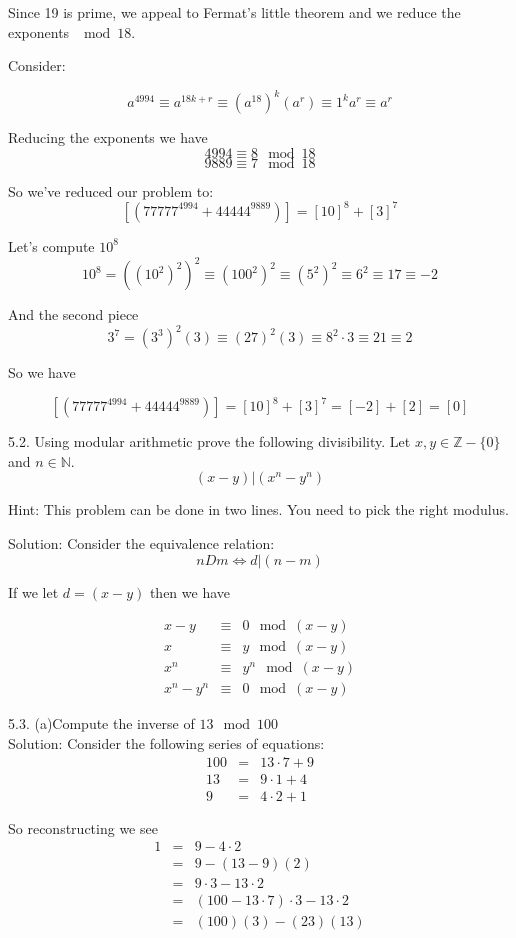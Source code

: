 \documentclass[16 pt]{amsart}
\theoremstyle{definition}
\theoremstyle{remark}
\numberwithin{equation}{subsection}
\newcommand{\Z}{\mathbb{Z}}
\begin{document}
Since 19 is prime, we appeal to Fermat's little theorem and we reduce the exponents $\mod 18$.  

Consider:

\[
a^{4994} \equiv a^{18k + r} \equiv (a^{18})^k(a^r) \equiv 1^k a^r \equiv a^r
\]


Reducing the exponents we have
\[
4994 \equiv 8 \mod 18
\]
\[
9889 \equiv 7 \mod 18
\]


So we've reduced our problem to:
\[
[(77777^{4994}+ 44444^{9889})] = [10]^8 + [3]^7
\]

Let's compute $10^8$
\[
10^8 = ((10^2)^2)^2 \equiv (100^2)^2 \equiv (5^2)^2 \equiv 6^2 \equiv 17 \equiv -2
\]

And the second piece
\[
3^7 = (3^3)^2 (3) \equiv (27)^2(3) \equiv 8^2\cdot 3 \equiv 21 \equiv 2
\]


So we have

\[
[(77777^{4994}+ 44444^{9889})] = [10]^8 + [3]^7 = [-2]+[2] = [0]
\]


5.2.  Using modular arithmetic prove the following divisibility.  Let $x,y\in\Z-\{0\}$ and $n\in\mathbb{N}$.
\[
(x-y)|(x^n-y^n)
\]

Hint: This problem can be done in two lines.  You need to pick the right modulus.



Solution: Consider the equivalence relation:
\[
nDm \iff d|(n-m)
\]

If we let $d=(x-y)$ then we have

\begin{eqnarray}
x-y & \equiv & 0 \mod (x-y)\nonumber\\
x  & \equiv & y \mod (x-y)\nonumber \\
x^n & \equiv & y^n \mod(x-y)\nonumber \\
x^n - y^n & \equiv & 0 \mod (x-y)\nonumber
\end{eqnarray}




5.3. (a)Compute the inverse of $13 \mod{100}$\\


Solution:  Consider the following series of equations:
\begin{eqnarray}
100 & = & 13\cdot 7 + 9 \nonumber \\
13 & = & 9 \cdot 1 + 4 \nonumber \\
9 & = & 4\cdot 2 + 1
\end{eqnarray}

So reconstructing we see
\begin{eqnarray}
1 & = & 9-4\cdot 2 \nonumber \\
  & = & 9 - (13-9)(2) \nonumber \\
 & = & 9\cdot 3 - 13\cdot 2 \nonumber \\
 & = & (100-13\cdot 7)\cdot 3 - 13\cdot 2 \nonumber\\
 & = & (100)(3) - (23)(13)\nonumber
 \end{eqnarray}
\end{document}
